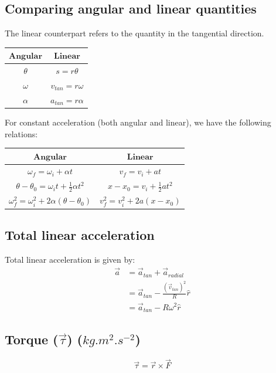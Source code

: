 \documentclass[11pt]{article}
\begin{document}
\subsection{Comparing angular and linear quantities}
\label{sec:orga979e69}
The linear counterpart refers to the quantity in the tangential direction.

\begin{center}
\begin{tabular}{ c|c }
\(\textbf{Angular}\) & \(\textbf{Linear}\) \\
\hline
\(\theta\) & \(s = r\theta\) \\
\(\omega\) & \(v_{tan} = r\omega\) \\
\(\alpha\) & \(a_{tan} = r\alpha\) \\
\end{tabular}
\end{center}

For constant acceleration (both angular and linear), we have the following relations:
\begin{center}
\begin{tabular}{ c|c }
\(\textbf{Angular}\) & \(\textbf{Linear}\) \\
\hline
\(\omega_f = \omega_i + \alpha t\) & \(v_f = v_i + at\) \\
\(\theta - \theta_0 = \omega_i t + \frac{1}{2} \alpha t^2\) & \(x - x_0 = v_i + \frac{1}{2} a t^2\) \\
\(\omega_f^2 = \omega_i^2 + 2 \alpha(\theta - \theta_0)\) & \(v_f^2 = v_i^2 + 2a(x - x_0)\)
\end{tabular}
\end{center}

\subsection{Total linear acceleration}
\label{sec:org36f5c3b}
Total linear acceleration is given by:
\begin{align*}
\vec{a} &= \vec{a}_{tan} + \vec{a}_{radial} \\
&= \vec{a}_{tan} - \frac{(\vec{v}_{tan})^2}{R} \hat{r} \\
&= \vec{a}_{tan} - R \omega^2 \hat{r}
\end{align*}

\subsection{Torque (\(\vec{\tau}\)) (\(\unit{kg.m^2.s^{-2}}\))}
\label{sec:org5d5fcb0}
\[\vec{\tau} = \vec{r} \times \vec{F}\]
\end{document}
